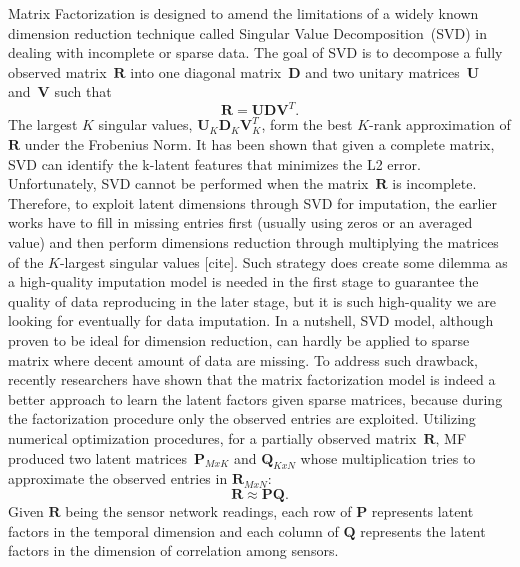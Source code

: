 Matrix Factorization is designed to amend the limitations of a widely known dimension reduction technique called Singular Value Decomposition~(SVD) in dealing with incomplete or sparse data.
The goal of SVD is to decompose a fully observed matrix~$\mathbf{R}$ into one diagonal matrix~$\mathbf{D}$ and two unitary matrices~$\mathbf{U}$ and~$\mathbf{V}$ such that
\begin{equation*} \mathbf{R} = \mathbf{U}\mathbf{D}\mathbf{V}^T. \end{equation*}
The largest $K$ singular values, $\mathbf{U}_K \mathbf{D}_K \mathbf{V}_K^T$, form the best $K$-rank approximation of $\mathbf{R}$ under the Frobenius Norm. It has been shown that given a complete matrix, SVD can identify the k-latent features that minimizes the L2 error. Unfortunately, SVD cannot be performed when the matrix~$\mathbf{R}$ is incomplete. Therefore, to exploit latent dimensions through SVD for imputation, the earlier works have to fill in missing entries first (usually using zeros or an averaged value) and then perform dimensions reduction through multiplying the matrices of the $K$-largest singular values [cite]. Such strategy does create some dilemma as a high-quality imputation model is needed in the first stage to guarantee the quality of data reproducing in the later stage, but it is such high-quality we are looking for eventually for data imputation. In a nutshell, SVD model, although proven to be ideal for dimension reduction, can hardly be applied to sparse matrix where decent amount of data are missing.
To address such drawback, recently researchers have shown \cite{koren2009matrix} that the matrix factorization model is indeed a better approach to learn the latent factors given sparse matrices, because during the factorization procedure only the observed entries are exploited.
Utilizing numerical optimization procedures, for a partially observed matrix~$\mathbf{R}$, MF produced two latent matrices~$\mathbf{P}_{MxK}$ and $\mathbf{Q}_{KxN}$ whose multiplication tries to approximate the observed entries in $\mathbf{R}_{MxN}$:
\begin{equation*}\mathbf{R} \approx \mathbf{P} \mathbf{Q}.\end{equation*}
Given $\mathbf{R}$ being the sensor network readings, each row of $\mathbf{P}$ represents latent factors in the temporal dimension and each column of $\mathbf{Q}$ represents the latent factors in the dimension of correlation among sensors.

